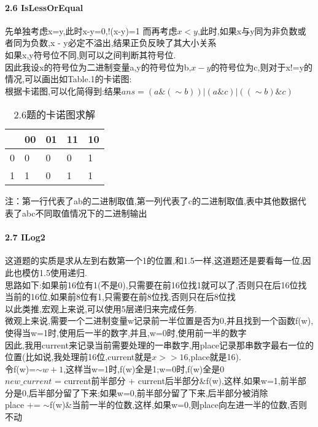 \documentclass{article}
\begin{document}
\begin{CJK}{UTF8}{gkai}
\paragraph{2.6 IsLessOrEqual} 
先单独考虑x=y,此时x-y=0,!(x-y)=1
而再考虑$x<y$,此时,如果x与y同为非负数或者同为负数,x - y必定不溢出,结果正负反映了其大小关系\\
如果x,y符号位不同,则可以之间判断其符号位.\\
因此我设x的符号位为二进制变量a,y的符号位为b,$x-y$的符号位为c,则对于x!=y的情况,可以画出如Table.1的卡诺图:\\
根据卡诺图,可以化简得到:结果$ans = (a\&(\sim b))|(a\&c)|((\sim b)\&c)$\\

\begin{table}[!htbp] 
	
	\caption{2.6题的卡诺图求解}
	\begin{flushleft} 
		\begin{tabular}{|l|l|l|l|l|} 
			\hline   & 00 & 01 & 11 & 10\\ 
			\hline 0 &0 &0 &0 &1 \\ 
			\hline 1 &1 &0 &1 &1 \\
			\hline
		\end{tabular} 
		注：第一行代表了ab的二进制取值,第一列代表了c的二进制取值,表中其他数据代表了abc不同取值情况下的二进制输出
	\end{flushleft} 
\end{table}

\paragraph{2.7 ILog2} 
这道题的实质是求从左到右数第一个1的位置,和1.5一样,这道题还是要看每一位,因此也模仿1.5使用递归.\\
思路如下:如果前16位有1(不是0),只需要在前16位找1就可以了,否则只在后16位找\\
当前的16位,如果前8位有1,只需要在前8位找,否则只在后8位找\\
以此类推,宏观上来说,可以使用5层递归来完成任务.\\
微观上来说,需要一个二进制变量w记录前一半位置是否为0,并且找到一个函数f(w),使得当w=1时,使用后一半的数字,并且,w=0时,使用前一半的数字\\
因此,我用current来记录当前需要处理的一串数字,用place记录那串数字最右一位的位置(比如说,我处理前16位,current就是$x>>16$,place就是16).\\
令f(w)=$\sim w+1$,这样当w=1时,f(w)全是1;w=0时,f(w)全是0\\
$new\_current$ = current前半部分 + current后半部分\&f(w),这样,如果w=1,前半部分是0,后半部分留了下来;如果w=0,前半部分留了下来,后半部分被消除\\
place += $\sim $f(w)\&当前一半的位数,这样,如果w=0,则place向左进一半的位数,否则不动\\



\end{CJK}
\end{document}
